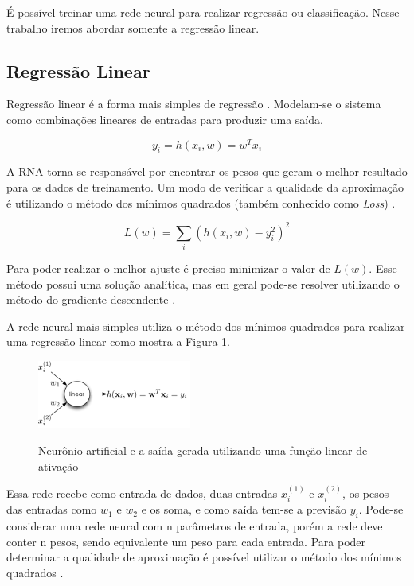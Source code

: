 É possível treinar uma rede neural para realizar regressão ou classificação. Nesse trabalho iremos abordar somente a regressão linear. 

\subsection{Regressão Linear}

Regressão linear é a forma mais simples de regressão \cite{ai}. Modelam-se o sistema como combinações lineares de entradas para produzir uma saída.

\begin{equation}
    y_i = h(x_i,w) = w^Tx_i
\end{equation}

A RNA torna-se responsável por encontrar os pesos que geram o melhor resultado para os dados de treinamento. Um modo de verificar a qualidade da aproximação é utilizando o método dos mínimos quadrados (também conhecido como \textit{Loss}) \cite{ltflow}.

\begin{equation}
    L(w) = \sum_i \left( h(x_i,w)-y_i^2 \right)^2
\end{equation}

Para poder realizar o melhor ajuste é preciso minimizar o valor de $L(w)$. Esse método possui uma solução analítica, mas em geral pode-se resolver utilizando o método do gradiente descendente \cite{ai}.

A rede neural mais simples utiliza o método dos mínimos quadrados para realizar uma regressão linear como mostra a Figura \ref{fig:linear}. 

\begin{figure}[h]
    \caption{Neurônio artificial e a saída gerada utilizando uma função linear de ativação}
    \centering
    \includegraphics[width=0.45\textwidth]{Textuais/Figuras/linear.png}
    \label{fig:linear}
\end{figure}

Essa rede recebe como entrada de dados, duas entradas $x_i^{(1)}$ e $x_i^{(2)}$, os pesos das entradas como $w_1$ e $w_2$ e os soma, e como saída tem-se a previsão $y_i$. Pode-se considerar uma rede neural com n parâmetros de entrada, porém a rede deve conter n pesos, sendo equivalente um peso para cada entrada. Para poder determinar a qualidade de aproximação é possível utilizar o método dos mínimos quadrados \cite{ML}.

